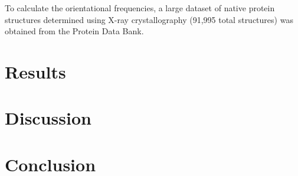 \documentclass[11pt]{article}
\begin{document}
To calculate the orientational frequencies, a large dataset of native protein structures determined using X-ray crystallography (91,995 total structures) was obtained from the Protein Data Bank.

\section{Results}

\section{Discussion}

\section{Conclusion}


{\footnotesize }
\end{document}
